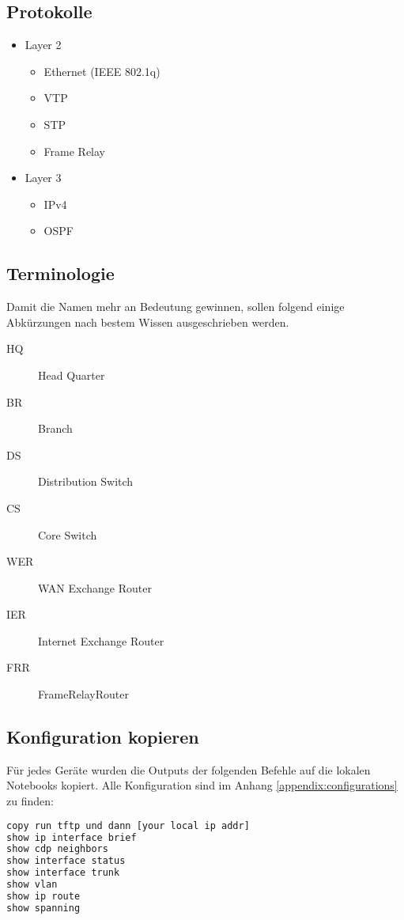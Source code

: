 \subsection{Protokolle}
\begin{itemize}
	\item Layer 2
	\begin{itemize}
		\item Ethernet (IEEE 802.1q)
		\item VTP
		\item STP
		\item Frame Relay
	\end{itemize}
	\item Layer 3
	\begin{itemize}
		\item IPv4
		\item OSPF
	\end{itemize}
\end{itemize}

\subsection{Terminologie}
Damit die Namen mehr an Bedeutung gewinnen, sollen folgend einige Abkürzungen nach bestem Wissen ausgeschrieben werden.
\begin{multicols}{2}
\begin{description}
	\item[HQ] Head Quarter
	\item[BR] Branch
	\item[DS] Distribution Switch
	\item[CS] Core Switch
	\item[WER] WAN Exchange Router
	\item[IER] Internet Exchange Router
	\item[FRR] FrameRelayRouter
\end{description}
\end{multicols}

\subsection{Konfiguration kopieren}
Für jedes Geräte wurden die Outputs der folgenden Befehle auf die lokalen Notebooks kopiert. Alle Konfiguration sind im Anhang \ref{appendix:configurations} zu finden:
\begin{lstlisting}[language=bash]
copy run tftp und dann [your local ip addr]
show ip interface brief
show cdp neighbors
show interface status
show interface trunk
show vlan
show ip route
show spanning
\end{lstlisting}

